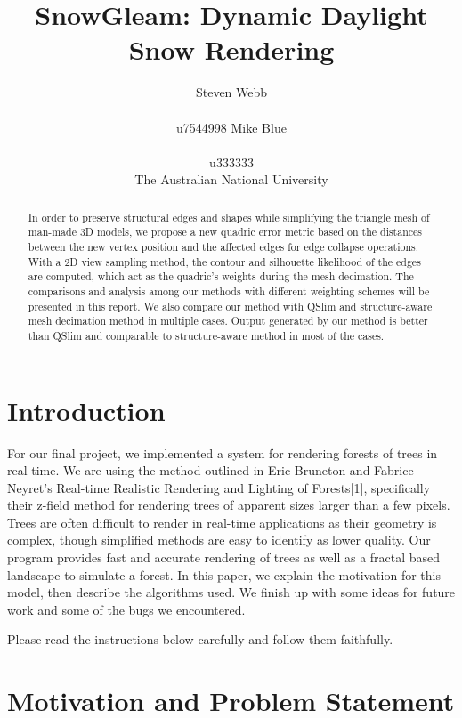 \documentclass{article}
\title{SnowGleam: Dynamic Daylight Snow Rendering}
\author{%
  Steven Webb\\\\
  u7544998 
   \And
  Mike Blue\\\\
  u333333\\
  \AND  The Australian National University 
}
\begin{document}
\maketitle


\begin{abstract}
  In order to preserve structural edges and shapes while simplifying the triangle mesh of man-made 3D models, we propose a new quadric error metric based on the distances between the new vertex position and the affected edges for edge collapse operations. With a 2D view sampling method, the contour and silhouette likelihood of the edges are computed, which act as the quadric’s weights during the mesh decimation. The comparisons and analysis among our methods with different weighting schemes will be presented in this report. We also compare our method with QSlim  and structure-aware mesh decimation method in multiple cases. Output generated by our method is better than QSlim and comparable to structure-aware method in most of the cases. 
\end{abstract}


\section{Introduction}

For our final project, we implemented a system for rendering forests of trees in real time. We are using the method outlined in Eric Bruneton and Fabrice Neyret’s Real-time Realistic Rendering and Lighting of Forests[1], specifically their z-field method for rendering trees of apparent sizes larger than a few pixels. Trees are often difficult to render in real-time applications as their geometry is complex, though simplified methods are easy to identify as lower quality. Our program provides fast and accurate rendering of trees as well as a fractal based landscape to simulate a forest. In this paper, we explain the motivation for this model, then describe the algorithms used. We finish up with some ideas for future work and some of the bugs we encountered.

Please read the instructions below carefully and follow them faithfully. 


\section{Motivation and Problem Statement}
\end{document}
